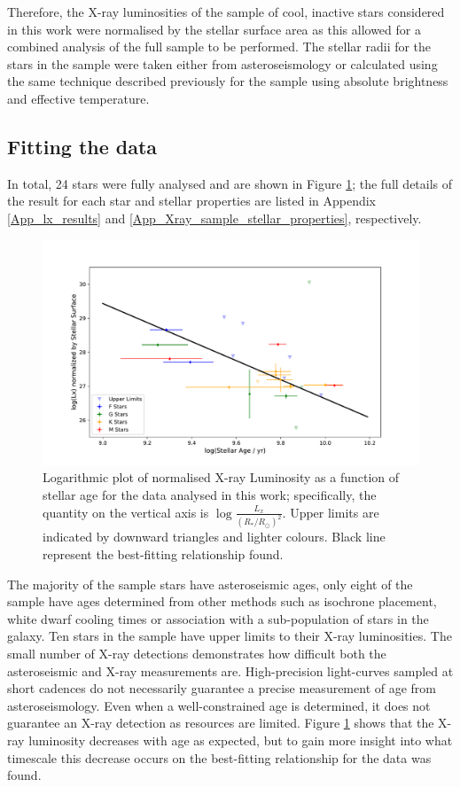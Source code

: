 Therefore, the X-ray luminosities of the sample of cool, inactive stars considered in this work were normalised by the stellar surface area as this allowed for a combined analysis of the full sample to be performed. The stellar radii for the stars in the sample were taken either from asteroseismology or calculated using the same technique described previously for the \citet{Schmitt_Liefke_2004} sample using absolute brightness and effective temperature.

\subsection{Fitting the data}
In total, 24 stars were fully analysed and are shown in Figure \ref{fig:Xray_sample}; the full details of the result for each star and stellar properties are listed in Appendix \ref{App_lx_results} and \ref{App_Xray_sample_stellar_properties}, respectively. 

\begin{figure}
    \centering
    \includegraphics[scale=0.55]{Figures/3-Xray_age/xray_results_with_fit.pdf}
    \caption[Plot of normalised X-ray luminosity as a function of age]{Logarithmic plot of normalised X-ray Luminosity as a function of stellar age for the data analysed in this work; specifically, the quantity on the vertical axis is $\log\frac{L_{x}}{(R_\ast/R_\odot)^{2}}$. Upper limits are indicated by downward triangles and lighter colours. Black line represent the best-fitting relationship found.}
    \label{fig:Xray_sample}
\end{figure}

The majority of the sample stars have asteroseismic ages, only eight of the sample have ages determined from other methods such as isochrone placement, white dwarf cooling times or association with a sub-population of stars in the galaxy. Ten stars in the sample have upper limits to their X-ray luminosities. The small number of X-ray detections demonstrates how difficult both the asteroseismic and X-ray measurements are. High-precision light-curves sampled at short cadences do not necessarily guarantee a precise measurement of age from asteroseismology. Even when a well-constrained age is determined, it does not guarantee an X-ray detection as resources are limited. Figure \ref{fig:Xray_sample} shows that the X-ray luminosity decreases with age as expected, but to gain more insight into what timescale this decrease occurs on the best-fitting relationship for the data was found.

